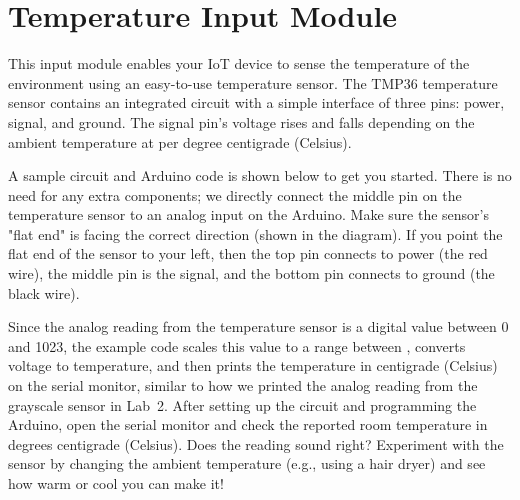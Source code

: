 
\clearpage
\section{Temperature Input Module}
\label{sec-input-temperature}

This input module enables your IoT device to sense the temperature of
the environment using an easy-to-use temperature sensor. The TMP36
temperature sensor contains an integrated circuit with a simple
interface of three pins: power, signal, and ground. The signal pin's
voltage rises and falls depending on the ambient temperature at
 per degree centigrade (Celsius).

A sample circuit and Arduino code is shown below to get you started.
There is no need for any extra components; we directly connect the
middle pin on the temperature sensor to an analog input on the Arduino.
Make sure the sensor's "flat end" is facing the correct direction (shown
in the diagram). If you point the flat end of the sensor to your left,
then the top pin connects to power (the red wire), the middle pin is the
signal, and the bottom pin connects to ground (the black wire).

Since the analog reading from the temperature sensor is a digital value
between 0 and 1023, the example code scales this value to a range
between , converts voltage to temperature, and then prints
the temperature in centigrade (Celsius) on the serial monitor, similar
to how we printed the analog reading from the grayscale sensor in Lab~2.
After setting up the circuit and programming the Arduino, open the
serial monitor and check the reported room temperature in degrees
centigrade (Celsius). Does the reading sound right? Experiment with the
sensor by changing the ambient temperature (e.g., using a hair dryer)
and see how warm or cool you can make it!

